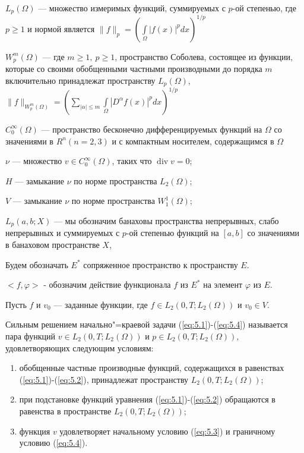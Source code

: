 $L_p(\Omega)$ --- множество измеримых функций, суммируемых с $p$-ой степенью, где $p\geqslant 1$
и нормой является $\|f\|_p=(\int\limits_\Omega |f(x)|^pdx)^{1/p}$

$W_p^m(\Omega)$ --- где $m\geqslant 1, \ p\geqslant 1$, пространство Соболева, состоящее из
функции, которые со своими обобщенными частными производными до порядка $m$ включительно принадлежат пространству $L_p(\Omega)$,\\
$\|f\|_{W_p^m(\Omega)}=\left(\sum_{|\alpha|\leqslant m} \int\limits_\Omega |D^{\alpha}f(x)|^pdx\right)^{1/p}$

$C_0^{\infty}(\Omega)$ --- пространство бесконечно дифференцируемых функций на $\Omega$ со значениями в $R^n(n=2, 3)$ и с компактным носителем,
содержащимся в $\Omega$

$\nu$ --- множество $v\in C_0^{\infty}(\Omega)$, таких что $\operatorname{div}v=0$;

$H$ --- замыкание $\nu$ по норме пространства $L_2(\Omega)$;

$V$ --- замыкание $\nu$ по норме пространства $W_1^1(\Omega)$;

$L_p(a, b;X)$ --- мы обозначим банаховы пространства непрерывных, слабо непрерывных и суммируемых с $p$-ой степенью функций на $[a, b]$ со значениями в
банаховом пространстве $X$,

Будем обозначать $E^*$ сопряженное пространство к пространству $E$.

$<f,\varphi>$ - обозначим действие функционала $f$ из $E^*$ на элемент $\varphi$ из $E$.

Пусть $f$ и $v_0$ --- заданные функции,
где $f\in L_2(0, T; L_2(\Omega))$ и $v_0\in V$.

\begin{definition}
    Сильным решением начально"=краевой задачи (\ref{eq:5.1})-(\ref{eq:5.4}) называется пара функций $v\in L_2(0, T; L_2(\Omega))$ и
    $p\in L_2(0, T; L_2(\Omega))$, удовлетворяющих следующим условиям:
\end{definition}

\begin{enumerate} 
    \item обобщенные частные производные функций, содержащихся в равенствах (\ref{eq:5.1})-(\ref{eq:5.2}), принадлежат пространству $L_2(0, T; L_2(\Omega))$;
    \item при подстановке функций уравнения (\ref{eq:5.1})-(\ref{eq:5.2}) обращаются в равенства в пространстве $L_2(0, T; L_2(\Omega))$;
    \item функция $v$ удовлетворяет начальному условию (\ref{eq:5.3}) и граничному условию (\ref{eq:5.4}).
\end{enumerate}


